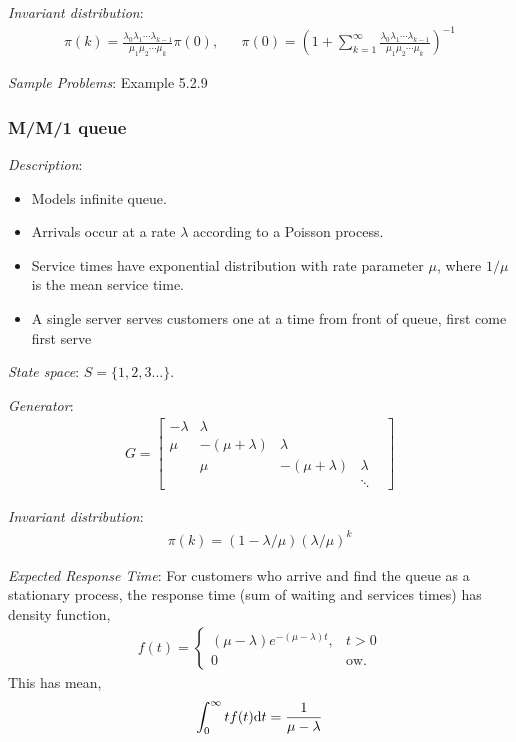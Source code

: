 \documentclass[12pt]{article}
\begin{document}
\textit{Invariant distribution}:
\begin{align*}
    \pi(k) = \frac{\lambda_0 \lambda_1 \cdots \lambda_{k-1}}{\mu_1 \mu_2 \cdots \mu_k} \pi(0), 
    && \pi(0) = \left( 1+ \sum_{k=1}^{\infty}   \frac{\lambda_0 \lambda_1 \cdots \lambda_{k-1}}{\mu_1 \mu_2 \cdots \mu_k}  \right)^{-1}
\end{align*}


\textit{Sample Problems}: Example 5.2.9



\subsubsection{M/M/1 queue}
\textit{Description}:
\begin{itemize}[nolistsep]
\item Models infinite queue. 
\item Arrivals occur at a rate \( \lambda \) according to a Poisson process. 
\item Service times have exponential distribution with rate parameter \( \mu \), where \( 1/\mu \) is the mean service time.
\item A single server serves customers one at a time from front of queue, first come first serve
\end{itemize}


\textit{State space}: \( S = \{1,2,3\ldots\}  \).

\textit{Generator}:
\begin{align*}
    G = \left[\begin{array}{ccccc}
        -\lambda & \lambda \\
        \mu & -(\mu+\lambda) & \lambda \\
        & \mu & -(\mu+\lambda) & \lambda \\
        &&  & \ddots &  
    \end{array}\right]
\end{align*}


\textit{Invariant distribution}:
\begin{align*}
    \pi(k) = (1-\lambda/\mu)(\lambda/\mu)^k
\end{align*}

\textit{Expected Response Time}:
For customers who arrive and find the queue as a stationary process, the response time (sum of waiting and services times) has density function,
\begin{align*}
    f(t) = \begin{cases}
        (\mu-\lambda)e^{-(\mu-\lambda)t}, & t > 0 \\ 0 & \text{ow.}
    \end{cases} 
\end{align*}
This has mean,
\begin{align*}
    \int_0^\infty tf(t)\mathrm{d} t = \frac{1}{\mu - \lambda}
\end{align*}
\end{document}
